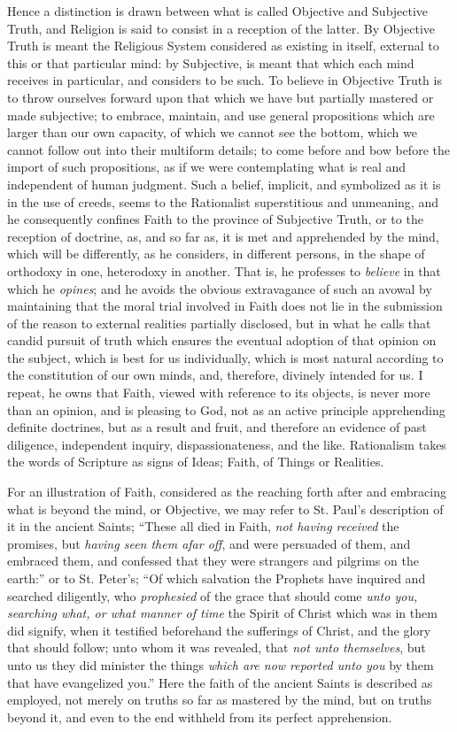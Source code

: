 Hence a distinction is drawn between what is
called Objective and Subjective Truth, and Religion is said to consist
in a reception of the latter. By Objective Truth is meant the
Religious System considered as existing in itself, external to this or
that particular mind: by Subjective, is meant that which each mind
receives in particular, and considers to be such. To believe in
Objective Truth is to throw ourselves forward upon that which we have
but partially mastered or made subjective; to embrace, maintain, and
use general propositions which are larger than our own capacity, of
which we cannot see the bottom, which we cannot follow out into their
multiform details; to come before and bow before the import of such
propositions, as if we were contemplating what is real and independent
of human judgment. Such a belief, implicit, and symbolized as it is in
the use of creeds, seems to the Rationalist superstitious and
unmeaning, and he consequently confines Faith to the province of
Subjective Truth, or to the reception of doctrine, as, and so far as,
it is met and apprehended by the mind, which will be differently, as
he considers, in different persons, in the shape of orthodoxy in one,
heterodoxy in another. That is, he professes to \emph{believe} in that
which he \emph{opines}; and he avoids the obvious extravagance of such
an avowal by maintaining that the moral trial involved in Faith does
not lie in the submission of the reason to external realities
partially disclosed, but in what he calls that candid pursuit of truth
which ensures the eventual adoption of that opinion on the subject,
which is best for us individually, which is most natural according to
the constitution of our own minds, and, therefore, divinely intended
for us. I repeat, he owns that Faith, viewed with reference to its
objects, is never more than an opinion, and is pleasing to God, not as
an active principle apprehending definite doctrines, but as a result
and fruit, and therefore an evidence of past diligence, independent
inquiry, dispassionateness, and the like. Rationalism takes the words
of Scripture as signs of Ideas; Faith, of Things or Realities.

For an illustration of Faith, considered as the
reaching forth after and embracing what is beyond the mind, or
Objective, we may refer to St. Paul's description of it in the ancient
Saints; ``These all died in Faith, \emph{not having received} the
promises, but \emph{having seen them afar off}, and were persuaded of
them, and embraced them, and confessed that they were strangers and
pilgrims on the earth:'' or to St. Peter's; ``Of which salvation the
Prophets have inquired and searched diligently, who \emph{prophesied}
of the grace that should come \emph{unto you, searching what, or what
manner of time} the Spirit of Christ which was in them did
signify, when it testified beforehand the sufferings of Christ, and
the glory that should follow; unto whom it was revealed, that \emph{not
unto themselves}, but unto us they did minister the things \emph{which
are now reported unto you} by them that have evangelized you.''
Here the faith of the ancient Saints is described as employed, not
merely on truths so far as mastered by the mind, but on truths beyond
it, and even to the end withheld from its perfect apprehension.

